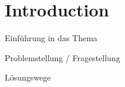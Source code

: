 \section{Introduction}
\label{sec:introduction}


Einführung in das Thema\cite{NYCOpenData}

Problemstellung / Fragestellung

Lösungswege
